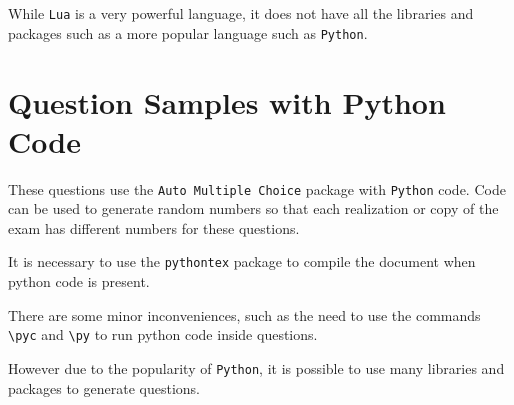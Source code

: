 \documentclass[a4paper]{article}
\begin{document}

While \texttt{Lua} is a very powerful language, it does not have all the libraries and packages such as a more popular language such as \texttt{Python}.

\section{Question Samples with Python Code}

These questions use the \texttt{Auto Multiple Choice} package with \texttt{Python} code.
Code can be used to generate random numbers so that each realization or copy of the exam has different numbers for these questions.

It is necessary to use the \texttt{pythontex} package to compile the document when python code is present.

There are some minor inconveniences, such as the need to use the commands \texttt{\textbackslash{}pyc{}} and \texttt{\textbackslash{}py{}} to run python code inside questions.

However due to the popularity of \texttt{Python}, it is possible to use many libraries and packages to generate questions.

\end{document}
